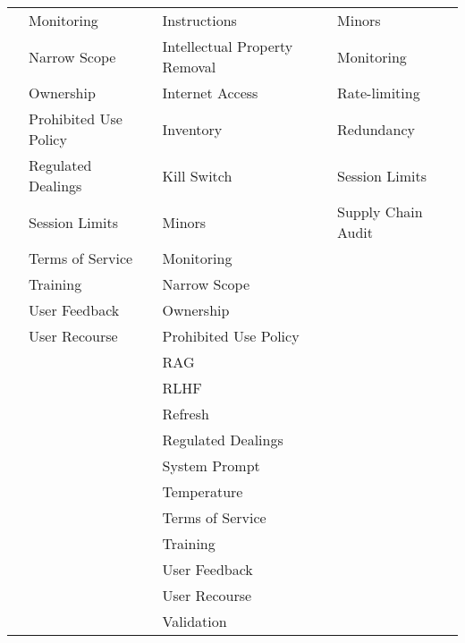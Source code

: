 \documentclass[fleqn]{article}
\begin{document}
\begin{table}[H]
\begin{tabular}{llll}
		& Monitoring & Instructions & Minors \\
		& Narrow Scope & Intellectual Property Removal & Monitoring \\
		& Ownership & Internet Access & Rate-limiting  \\
		& Prohibited Use Policy & Inventory & Redundancy \\
		& Regulated Dealings & Kill Switch & Session Limits \\
		& Session Limits & Minors & Supply Chain Audit \\
		& Terms of Service & Monitoring &  \\
		& Training  & Narrow Scope &  \\
		& User Feedback & Ownership &  \\
		& User Recourse & Prohibited Use Policy &  \\
		&  & RAG &  \\
		&  & RLHF &  \\
		&  & Refresh &  \\
		&  & Regulated Dealings &  \\
		&  & System Prompt  &  \\
		&  & Temperature &  \\
		&  & Terms of Service &  \\
		&  & Training  &  \\
		&  & User Feedback &  \\
		&  & User Recourse &  \\
		&  & Validation &  \\
		\bottomrule
	\end{tabular}	
\end{table}

\pagebreak
\end{document}
